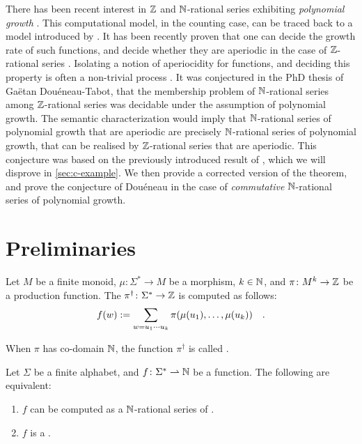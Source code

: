 \documentclass[sigconf,natbib=false,screen, review,anonymous]{acmart}
\begin{document}
There has been recent interest in $\mathbb{Z}$ and $\mathbb{N}$-rational series exhibiting
\emph{polynomial growth} \cite{doueneau2021pebble,bojanczyk2022transducers}.
This computational model, in the counting case, can be traced back to a model
introduced by \textcite{schutzenberger1965finite}. It has been recently proven
that one can decide the growth rate of such functions, and decide whether they
are aperiodic in the case of $\mathbb{Z}$-rational series \cite{LOPEZ23b}. Isolating
a notion of aperiocidity for functions, and deciding this property is often a
non-trivial process \cite{droste2019aperiodic}. It was conjectured in the PhD
thesis of Gaëtan Douéneau-Tabot, that the membership problem of $\mathbb{N}$-rational
series among $\mathbb{Z}$-rational series was decidable under the assumption of
polynomial growth. The semantic characterization would imply that
$\mathbb{N}$-rational series of polynomial growth that are aperiodic are precisely
$\mathbb{N}$-rational series of polynomial growth, that can be realised by
$\mathbb{Z}$-rational series that are aperiodic. This conjecture was based on the
previously introduced result of \textcite[Theorem 3.3]{KARH77}, which we will
disprove in \cref{sec:c-example}. 
We then provide a corrected version of the theorem, and prove the conjecture
of Douéneau in the case of \emph{commutative} $\mathbb{N}$-rational series of
polynomial growth.

\section{Preliminaries}


\begin{definition}
    Let $M$ be a finite monoid, $\mu \colon \Sigma^* \to M$
    be a morphism, $k \in \mathbb{N}$, and 
    $\pi \colon M^k \to \mathbb{Z}$ be a production function.
    The 
    $\pi^\dagger \colon \Sigma^* \to \mathbb{Z}$
    is computed as follows:
    \begin{equation*}
        f(w) \mathrel{:=}
        \sum_{w = u_1 \cdots u_k} \pi(\mu(u_1), \dots, \mu(u_k))
        \quad .
    \end{equation*}

    When $\pi$ has co-domain $\mathbb{N}$, the function $\pi^\dagger$
    is called .
\end{definition}



\begin{fact}
    \label{polynomial-rational-polyreg:fact}
    Let $\Sigma$ be a finite alphabet, and $f \colon \Sigma^* \rightharpoonup \mathbb{N}$
    be a function. The following are equivalent:
    \begin{enumerate}
        \item $f$ can be computed as a \k{$\mathbb{N}$-rational series}
            of .
        \item $f$ is a .
    \end{enumerate}
\end{fact}
\end{document}
